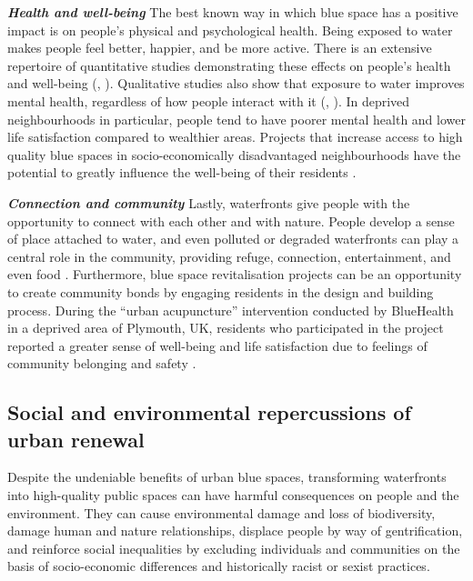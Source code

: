 \documentclass{article}
\newcommand{\bisection}[1]{\textbf{\textit{#1}}}
\begin{document}
\bisection{Health and well-being}
The best known way in which blue space has a positive impact is on people's physical and psychological health. Being exposed to water makes people feel better, happier, and be more active. 
There is an extensive repertoire of quantitative studies demonstrating these effects on people's health and well-being (\cite{gascon2017outdoor}, \cite{britton2020blue}).
Qualitative studies also show that exposure to water improves mental health, regardless of how people interact with it (\cite{garrett2019urban}, \cite{van2021urban}).
In deprived neighbourhoods in particular, people tend to have poorer mental health and lower life satisfaction compared to wealthier areas. Projects that increase access to high quality blue spaces in socio-economically disadvantaged neighbourhoods have the potential to greatly influence the well-being of their residents \parencite{van2021urban}.

\bisection{Connection and community}
Lastly, waterfronts give people with the opportunity to connect with each other and with nature. People develop a sense of place attached to water, and even polluted or degraded waterfronts can play a central role in the community, providing refuge, connection, entertainment, and even food \parencite{toomey2021place}. 
Furthermore, blue space revitalisation projects can be an opportunity to create community bonds by engaging residents in the design and building process. During the ``urban acupuncture'' intervention conducted by BlueHealth in a deprived area of Plymouth, UK, residents who participated in the project reported a greater sense of well-being and life satisfaction due to feelings of community belonging and safety \parencite{van2021urban}.



\subsection{Social and environmental repercussions of urban renewal}

Despite the undeniable benefits of urban blue spaces, transforming waterfronts into high-quality public spaces can have harmful consequences on people and the environment. They can cause environmental damage and loss of biodiversity, damage human and nature relationships, displace people by way of gentrification, and reinforce social inequalities by excluding individuals and communities on the basis of socio-economic differences and historically racist or sexist practices.
\end{document}
